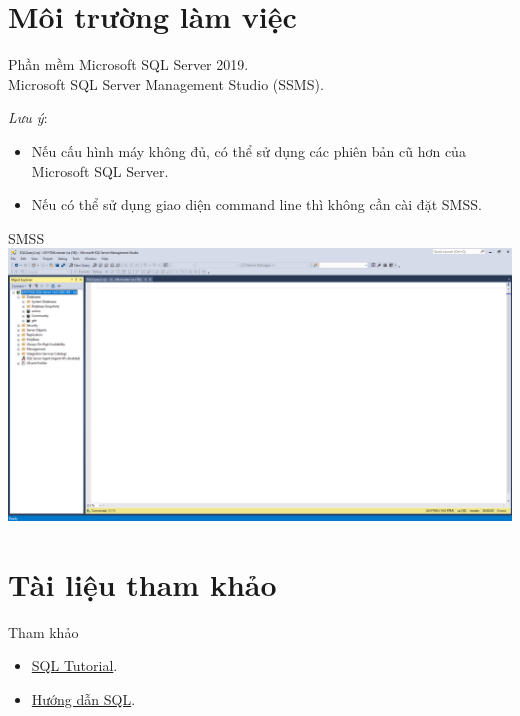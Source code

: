 \documentclass[11pt]{beamer}
\begin{document}
    \section{Môi trường làm việc}
    \begin{frame}{Phần mềm}
        Microsoft SQL Server 2019.\\
        Microsoft SQL Server Management Studio (SSMS).

        \textit{Lưu ý}: 
        \begin{itemize}
            \item Nếu cấu hình máy không đủ, có thể sử dụng các phiên bản 
            cũ hơn của Microsoft SQL Server.
            \item Nếu có thể sử dụng giao diện command line thì không cần cài đặt SMSS.
        \end{itemize}
        
    \end{frame}

    \begin{frame}{SMSS}
        \includegraphics[width=\textwidth]{smss.png}
    \end{frame}

    \section{Tài liệu tham khảo}
    \begin{frame}{Tham khảo}
        \begin{itemize}
            \item \href{https://www.w3schools.com/sql/}{SQL Tutorial}.
            \item \href{https://vietjack.com/sql/}{Hướng dẫn SQL}.
        \end{itemize}
    \end{frame}
\end{document}
